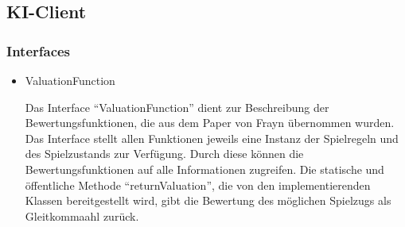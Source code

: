 \documentclass[a4paper,10pt]{article}
\begin{document}
\subsection{KI-Client}
\subsubsection{Interfaces}
\begin{itemize}
\item ValuationFunction

Das Interface "`ValuationFunction"' dient zur Beschreibung der Bewertungsfunktionen, die aus dem Paper von Frayn übernommen wurden. Das Interface stellt allen Funktionen jeweils eine Instanz der Spielregeln und des Spielzustands zur Verfügung. Durch diese können die Bewertungsfunktionen auf alle Informationen zugreifen.
Die statische und öffentliche Methode "`returnValuation"', die von den implementierenden Klassen bereitgestellt wird, gibt die Bewertung des möglichen Spielzugs als Gleitkommaahl zurück.
\end{itemize}
\end{document}
